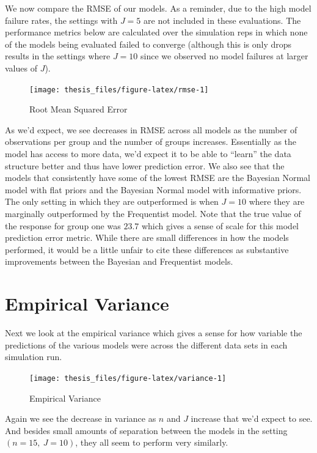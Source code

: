 \documentclass[12pt,twoside]{reedthesis}
\begin{document}
We now compare the RMSE of our models. As a reminder, due to the high model failure rates, the settings with \(J = 5\) are not included in these evaluations. The performance metrics below are calculated over the simulation reps in which none of the models being evaluated failed to converge (although this is only drops results in the settings where \(J = 10\) since we observed no model failures at larger values of \(J\)).
\begin{figure}

{\centering \texttt{[image: thesis\_files/figure-latex/rmse-1]} 

}

\caption{Root Mean Squared Error}\label{fig:rmse}
\end{figure}
As we'd expect, we see decreases in RMSE across all models as the number of observations per group and the number of groups increases. Essentially as the model has access to more data, we'd expect it to be able to ``learn'' the data structure better and thus have lower prediction error. We also see that the models that consistently have some of the lowest RMSE are the Bayesian Normal model with flat priors and the Bayesian Normal model with informative priors. The only setting in which they are outperformed is when \(J = 10\) where they are marginally outperformed by the Frequentist model. Note that the true value of the response for group one was \(23.7\) which gives a sense of scale for this model prediction error metric. While there are small differences in how the models performed, it would be a little unfair to cite these differences as substantive improvements between the Bayesian and Frequentist models.

\hypertarget{empirical-variance}{%
\section{Empirical Variance}\label{empirical-variance}}

Next we look at the empirical variance which gives a sense for how variable the predictions of the various models were across the different data sets in each simulation run.
\begin{figure}

{\centering \texttt{[image: thesis\_files/figure-latex/variance-1]} 

}

\caption{Empirical Variance}\label{fig:variance}
\end{figure}
Again we see the decrease in variance as \(n\) and \(J\) increase that we'd expect to see. And besides small amounts of separation between the models in the setting \((n = 15, \ J = 10)\), they all seem to perform very similarly.
\end{document}
